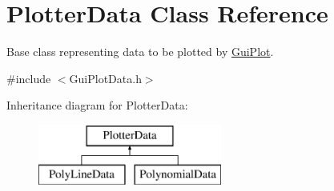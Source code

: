 \hypertarget{class_plotter_data}{\section{Plotter\-Data Class Reference}
\label{class_plotter_data}
}


Base class representing data to be plotted by \hyperlink{class_gui_plot}{Gui\-Plot}.  




{\ttfamily \#include $<$Gui\-Plot\-Data.\-h$>$}

Inheritance diagram for Plotter\-Data\-:\begin{figure}[H]
\begin{center}
\leavevmode
\includegraphics[height=2.000000cm]{class_plotter_data}
\end{center}
\end{figure}
